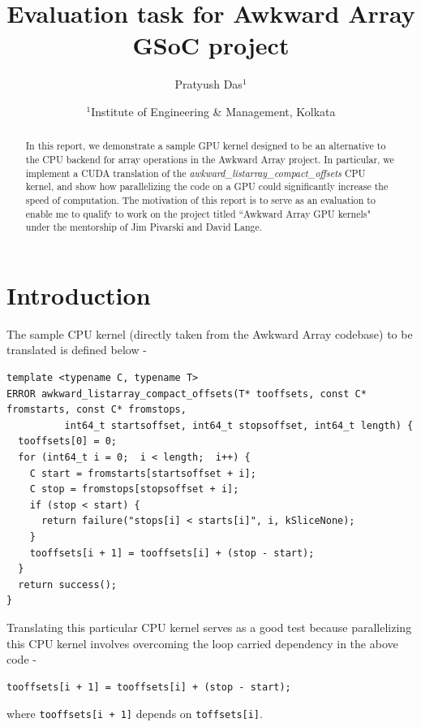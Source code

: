 \documentclass{article}
\title{Evaluation task for Awkward Array GSoC project}
\author{Pratyush Das$^1$}
\date{%
    $^1$Institute of Engineering \& Management, Kolkata\\%
}
\begin{document}

\maketitle

\begin{abstract}

    In this report, we demonstrate a sample GPU kernel designed to be an alternative to the CPU backend for array operations in the Awkward Array project. In particular, we implement a CUDA translation of the \textit{awkward\_listarray\_compact\_offsets} CPU kernel, and show how parallelizing the code on a GPU could significantly increase the speed of computation. The motivation of this report is to serve as an evaluation to enable me to qualify to work on the project titled ``Awkward Array GPU kernels" under the mentorship of Jim Pivarski and David Lange.

\end{abstract}

\section{Introduction}

The sample CPU kernel (directly taken from the Awkward Array codebase) to be translated is defined below -
\begin{mdframed}[backgroundcolor=light-gray, roundcorner=10pt,leftmargin=0.5, rightmargin=0.5, innertopmargin=5,innerbottommargin=5, outerlinewidth=1, linecolor=light-gray]
\begin{verbatim}
template <typename C, typename T>
ERROR awkward_listarray_compact_offsets(T* tooffsets, const C* fromstarts, const C* fromstops, 
          int64_t startsoffset, int64_t stopsoffset, int64_t length) {
  tooffsets[0] = 0;
  for (int64_t i = 0;  i < length;  i++) {
    C start = fromstarts[startsoffset + i];
    C stop = fromstops[stopsoffset + i];
    if (stop < start) {
      return failure("stops[i] < starts[i]", i, kSliceNone);
    }
    tooffsets[i + 1] = tooffsets[i] + (stop - start);
  }
  return success();
}
\end{verbatim}
\end{mdframed}
Translating this particular CPU kernel serves as a good test because parallelizing this CPU kernel involves overcoming the loop carried dependency in the above code -
\begin{mdframed}[backgroundcolor=light-gray, roundcorner=10pt,leftmargin=0.5, rightmargin=0.5, innertopmargin=1,innerbottommargin=1, outerlinewidth=1, linecolor=light-gray]
\begin{verbatim}
tooffsets[i + 1] = tooffsets[i] + (stop - start);
\end{verbatim}
\end{mdframed}
where \texttt{tooffsets[i + 1]} depends on \texttt{toffsets[i]}.\\
\end{document}
